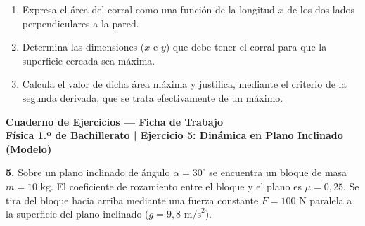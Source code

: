 \documentclass[11pt,a4paper]{article}
\begin{document}
\vspace{0.3cm}
\begin{enumerate}[label=\textbf{\alph*)}, leftmargin=2em, itemsep=12pt]
    \item Expresa el área del corral como una función de la longitud $x$ de los dos lados perpendiculares a la pared.
    \item Determina las dimensiones ($x$ e $y$) que debe tener el corral para que la superficie cercada sea máxima.
    \item Calcula el valor de dicha área máxima y justifica, mediante el criterio de la segunda derivada, que se trata efectivamente de un máximo.
\end{enumerate}

\newpage

\begin{center}
    {\LARGE \textbf{Cuaderno de Ejercicios — Ficha de Trabajo}}\\[4pt]
    {\large \textbf{Física 1.º de Bachillerato | Ejercicio 5: Dinámica en Plano Inclinado (Modelo)}}
\end{center}

\vspace{0.3cm}
\noindent\textbf{5.} Sobre un plano inclinado de ángulo $\alpha = 30^\circ$ se encuentra un bloque de masa $m = 10\text{ kg}$. El coeficiente de rozamiento entre el bloque y el plano es $\mu = 0{,}25$. Se tira del bloque hacia arriba mediante una fuerza constante $F = 100\text{ N}$ paralela a la superficie del plano inclinado ($g = 9{,}8\text{ m/s}^2$).

\begin{center}
\end{center}
\end{document}
